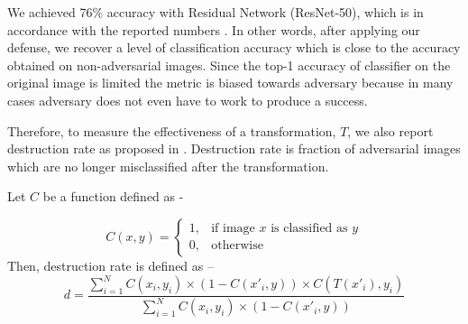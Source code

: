 We achieved 76\% accuracy with Residual Network (ResNet-50), which is in accordance with the reported numbers \cite{He2016DeepRL}.
In other words, after applying our defense, we recover a level of classification accuracy which is close to the accuracy obtained on non-adversarial images.
Since the top-1 accuracy of classifier on the original image is limited the metric is biased towards adversary because in many cases adversary does not even have to work to produce a success.


Therefore, to measure the effectiveness of a transformation, $T$, we also report destruction rate as proposed in \cite{Kurakin2016AdversarialEI}. 
Destruction rate is fraction of adversarial images which are no longer misclassified after the transformation. 

Let $C$ be a function defined as -

\[
C(x,y) = \begin{cases}
  1, & \text{if image $x$ is classified as $y$} \\
  0, & \text{otherwise}
\end{cases}
\]
Then, destruction rate is defined as --
\[
d = \frac{\sum_{i=1}^N C(x_i, y_i) \times (1 - C(x'_i,y)) \times C(T(x'_i),y_i)}{\sum_{i=1}^N C(x_i, y_i) \times (1 - C(x'_i,y))}
\]


